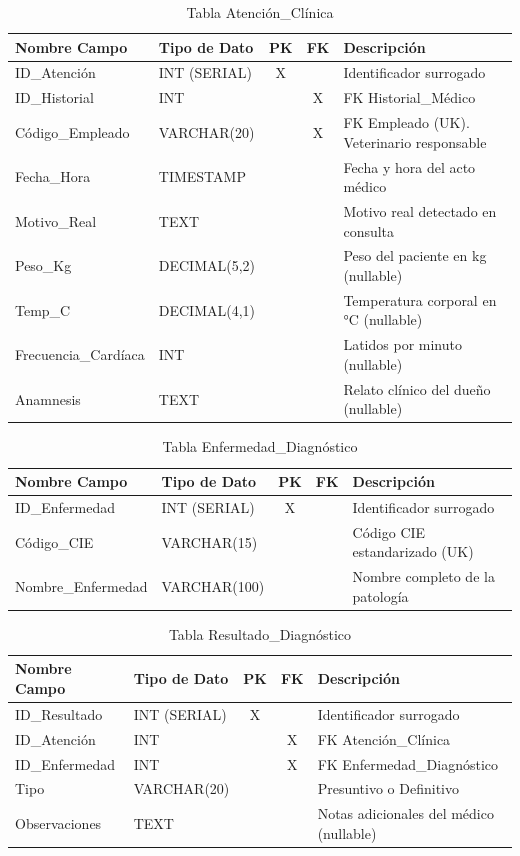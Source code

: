 \begin{table}[H]
\centering
\footnotesize
\begin{tabular}{|l|l|c|c|p{5cm}|}
\hline
\textbf{Nombre Campo} & \textbf{Tipo de Dato} & \textbf{PK} & \textbf{FK} & \textbf{Descripción} \\
\hline
ID\_Atención & INT (SERIAL) & X & & Identificador surrogado \\
\hline
ID\_Historial & INT & & X & FK Historial\_Médico \\
\hline
Código\_Empleado & VARCHAR(20) & & X & FK Empleado (UK). Veterinario responsable \\
\hline
Fecha\_Hora & TIMESTAMP & & & Fecha y hora del acto médico \\
\hline
Motivo\_Real & TEXT & & & Motivo real detectado en consulta \\
\hline
Peso\_Kg & DECIMAL(5,2) & & & Peso del paciente en kg (nullable) \\
\hline
Temp\_C & DECIMAL(4,1) & & & Temperatura corporal en °C (nullable) \\
\hline
Frecuencia\_Cardíaca & INT & & & Latidos por minuto (nullable) \\
\hline
Anamnesis & TEXT & & & Relato clínico del dueño (nullable) \\
\hline
\end{tabular}
\caption{Tabla Atención\_Clínica}
\end{table}

\begin{table}[H]
\centering
\footnotesize
\begin{tabular}{|l|l|c|c|p{5cm}|}
\hline
\textbf{Nombre Campo} & \textbf{Tipo de Dato} & \textbf{PK} & \textbf{FK} & \textbf{Descripción} \\
\hline
ID\_Enfermedad & INT (SERIAL) & X & & Identificador surrogado \\
\hline
Código\_CIE & VARCHAR(15) & & & Código CIE estandarizado (UK) \\
\hline
Nombre\_Enfermedad & VARCHAR(100) & & & Nombre completo de la patología \\
\hline
\end{tabular}
\caption{Tabla Enfermedad\_Diagnóstico}
\end{table}

\begin{table}[H]
\centering
\footnotesize
\begin{tabular}{|l|l|c|c|p{5cm}|}
\hline
\textbf{Nombre Campo} & \textbf{Tipo de Dato} & \textbf{PK} & \textbf{FK} & \textbf{Descripción} \\
\hline
ID\_Resultado & INT (SERIAL) & X & & Identificador surrogado \\
\hline
ID\_Atención & INT & & X & FK Atención\_Clínica \\
\hline
ID\_Enfermedad & INT & & X & FK Enfermedad\_Diagnóstico \\
\hline
Tipo & VARCHAR(20) & & & Presuntivo o Definitivo \\
\hline
Observaciones & TEXT & & & Notas adicionales del médico (nullable) \\
\hline
\end{tabular}
\caption{Tabla Resultado\_Diagnóstico}
\end{table}

